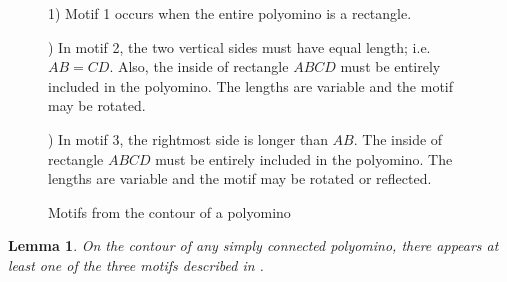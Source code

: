\documentclass{article}
\newtheorem{lemma}{Lemma}
\begin{document}
\begin{figure}[ht]
    \begin{center}
    \end{center}
    
    \medskip
    
    1) Motif 1 occurs when the entire polyomino is a rectangle.
   
    ) In motif 2, the two vertical sides must have equal length; i.e. $AB=CD$. Also, the inside of rectangle $ABCD$ must be entirely included in the polyomino. The lengths are variable and the motif may be rotated.
    
    ) In motif 3, the rightmost side is longer than $AB$. The inside of rectangle $ABCD$ must be entirely included in the polyomino. The lengths are variable and the motif may be rotated or reflected.
    
    \caption{Motifs from the contour of a polyomino}
    \label{pans}
\end{figure}


\begin{lemma}\label{shadok}
On the contour of any simply connected polyomino, there appears at least one of the three motifs described in .
\end{lemma}
\end{document}
